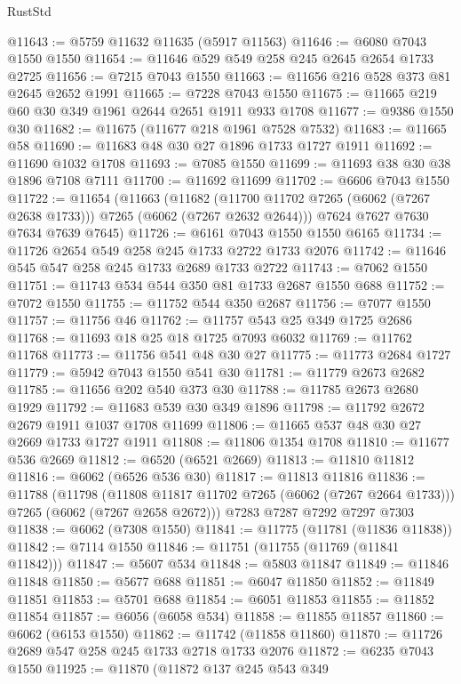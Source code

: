 \begin{lexlean}{RustStd}
\begin{coremodule}
@11643 := @5759 @11632 @11635 (@5917 @11563)
@11646 := @6080 @7043 @1550 @1550
@11654 := @11646 @529 @549 @258 @245 @2645 @2654 @1733 @2725
@11656 := @7215 @7043 @1550
@11663 := @11656 @216 @528 @373 @81 @2645 @2652 @1991
@11665 := @7228 @7043 @1550
@11675 := @11665 @219 @60 @30 @349 @1961 @2644 @2651 @1911 @933 @1708
@11677 := @9386 @1550 @30
@11682 := @11675 (@11677 @218 @1961 @7528 @7532)
@11683 := @11665 @58
@11690 := @11683 @48 @30 @27 @1896 @1733 @1727 @1911
@11692 := @11690 @1032 @1708
@11693 := @7085 @1550
@11699 := @11693 @38 @30 @38 @1896 @7108 @7111
@11700 := @11692 @11699
@11702 := @6606 @7043 @1550
@11722 := @11654
    (@11663
      (@11682 (@11700 @11702 @7265 (@6062 (@7267 @2638 @1733))) @7265 (@6062 (@7267 @2632 @2644)))
      @7624
      @7627
      @7630
      @7634
      @7639
      @7645)
@11726 := @6161 @7043 @1550 @1550 @6165
@11734 := @11726 @2654 @549 @258 @245 @1733 @2722 @1733 @2076
@11742 := @11646 @545 @547 @258 @245 @1733 @2689 @1733 @2722
@11743 := @7062 @1550
@11751 := @11743 @534 @544 @350 @81 @1733 @2687 @1550 @688
@11752 := @7072 @1550
@11755 := @11752 @544 @350 @2687
@11756 := @7077 @1550
@11757 := @11756 @46
@11762 := @11757 @543 @25 @349 @1725 @2686
@11768 := @11693 @18 @25 @18 @1725 @7093 @6032
@11769 := @11762 @11768
@11773 := @11756 @541 @48 @30 @27
@11775 := @11773 @2684 @1727
@11779 := @5942 @7043 @1550 @541 @30
@11781 := @11779 @2673 @2682
@11785 := @11656 @202 @540 @373 @30
@11788 := @11785 @2673 @2680 @1929
@11792 := @11683 @539 @30 @349 @1896
@11798 := @11792 @2672 @2679 @1911 @1037 @1708 @11699
@11806 := @11665 @537 @48 @30 @27 @2669 @1733 @1727 @1911
@11808 := @11806 @1354 @1708
@11810 := @11677 @536 @2669
@11812 := @6520 (@6521 @2669)
@11813 := @11810 @11812
@11816 := @6062 (@6526 @536 @30)
@11817 := @11813 @11816
@11836 := @11788
    (@11798
      (@11808 @11817 @11702 @7265 (@6062 (@7267 @2664 @1733)))
      @7265
      (@6062 (@7267 @2658 @2672)))
    @7283
    @7287
    @7292
    @7297
    @7303
@11838 := @6062 (@7308 @1550)
@11841 := @11775 (@11781 (@11836 @11838))
@11842 := @7114 @1550
@11846 := @11751 (@11755 (@11769 (@11841 @11842)))
@11847 := @5607 @534
@11848 := @5803 @11847
@11849 := @11846 @11848
@11850 := @5677 @688
@11851 := @6047 @11850
@11852 := @11849 @11851
@11853 := @5701 @688
@11854 := @6051 @11853
@11855 := @11852 @11854
@11857 := @6056 (@6058 @534)
@11858 := @11855 @11857
@11860 := @6062 (@6153 @1550)
@11862 := @11742 (@11858 @11860)
@11870 := @11726 @2689 @547 @258 @245 @1733 @2718 @1733 @2076
@11872 := @6235 @7043 @1550
@11925 := @11870
    (@11872
      @137
      @245
      @543
      @349

\end{coremodule}
\end{lexlean}
